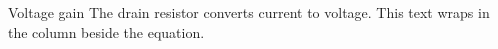 \begin{notederivation}[mode=steps,explanation=beside,
  equation-width=0.48\linewidth,gap=6mm]{Voltage gain}
    {The drain resistor converts current to voltage. This text
     wraps in the column beside the equation.}
\end{notederivation}

